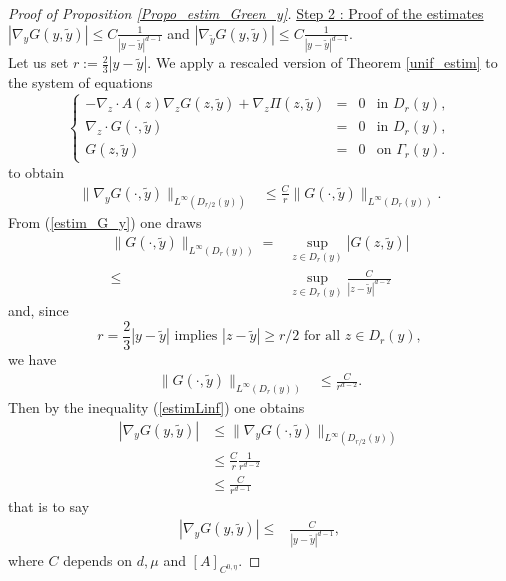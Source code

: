 \documentclass[11pt, reqno]{amsart}
\theoremstyle{definition}
\theoremstyle{remark}
\numberwithin{equation}{section}
\begin{document}
\begin{appendices}
\begin{proof}[Proof of \textup{Proposition \ref{Propo_estim_Green_y}}]
		
		
		
		\noindent \underline{Step 2 : Proof of the estimates}  $| \nabla_y G(y,\tilde{y})| \leq C  \frac{1 }{|y-\tilde{y}|^{d-1}}$ and  $| \nabla_{\tilde{y}} G(y,\tilde{y})| \leq C  \frac{1 }{|y-\tilde{y}|^{d-1}}.$\\
		Let us set $r:=\frac{2}{3}|y-\tilde{y}|.$ 
		We apply a rescaled version of Theorem \ref{unif_estim} to the system of equations 
		\begin{equation}
			\left\{
			\begin{array}{rcll}
				-\nabla_z\cdot A (z)  \nabla_z G(z,\tilde{y}) +  \nabla_z \Pi(z,\tilde{y})&=& 0 &\mbox{in } D_r(y),\\
				\nabla_z\cdot G(\cdot,\tilde{y})&=& 0    &\mbox{in } D_r(y),\\
				G(z,\tilde{y}) &=& 0  & \mbox{on } \Gamma_r(y).
			\end{array}
			\right. 
		\end{equation}
		to obtain
		\begin{align}
			\|\nabla_y G(\cdot ,\tilde{y})\|_{L^{\infty}(D_{r/2}(y))} 
			&\leq \frac{C}{r} \|  G(\cdot ,\tilde{y})\|_{L^{\infty}(D_{r}(y))}.\label{estimLinf}
		\end{align}
		From  (\ref{estim_G_y}) one draws
		\begin{align*}
			\|  G(\cdot ,\tilde{y})\|_{L^{\infty}(D_{r}(y))} =& \sup_{z\in{D_{r}(y)}} |G(z ,\tilde{y})|\nonumber \\
			\leq& \sup_{z\in{D_{r}(y)}} \frac{C }{|z-\tilde{y}|^{d-2}}
		\end{align*}
		and, since $$r=\frac{2}{3}|y-\tilde{y}| \mbox{  implies  } |z-\tilde{y}| \geq r/2  \mbox{ for all } z \in{D_{r}(y)},$$ 
		we have
		\begin{align*}
			\|  G(\cdot ,\tilde{y})\|_{L^{\infty}(D_{r}(y))} 
			& \leq\frac{ C }{r^{d-2}}. 
		\end{align*}
		Then by the inequality (\ref{estimLinf}) one obtains
		\begin{align}
			|\nabla_y G(y,\tilde{y})|  &\leq\|\nabla_y G(\cdot ,\tilde{y})\|_{L^{\infty}(D_{r/2}(y))}\nonumber\\ 
			& \leq\frac{C}{r}  \frac{1}{r^{d-2}}\nonumber\\
			& \leq \frac{C}{r^{d-1}} \label{dminus1}
		\end{align}
		that is to say
		\begin{align*}
			|\nabla_y G(y ,\tilde{y})|
			\leq&  \frac{C }{|y-\tilde{y}|^{d-1}},
		\end{align*}
		where $C$ depends on $d, \mu$ and  $[A]_{C^{0,\eta}}$.
		

\end{proof}
\end{appendices}
\end{document}
